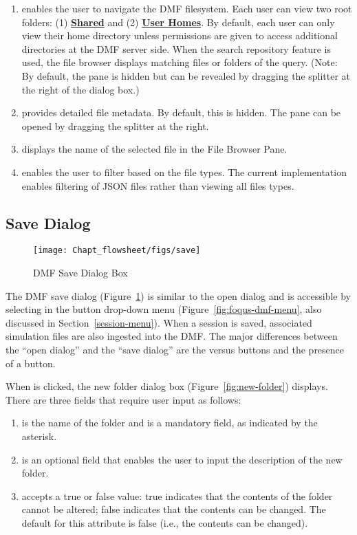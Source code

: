 {\begin{enumerate}
\item {} enables the user to navigate the DMF filesystem.
  Each user can view two root folders: (1) \textbf{\underline{Shared}} and (2) \textbf{\underline{User Homes}}. By default, each user can only view their home directory
  unless permissions are given to access additional directories at the DMF server side.
  When the search repository feature is used, the file browser displays matching files or folders of the query.
  (Note: By default, the pane is hidden but can be revealed by dragging the
  splitter at the right of the dialog box.)
\item {} provides detailed file metadata. By default, this is hidden. The pane can be opened by dragging the splitter at the right.
\item {} displays the name of the selected file in the File Browser Pane.
\item {} enables the user to filter based on the file types. The current implementation enables filtering of JSON files rather than viewing all files types.
\end{enumerate}

\subsection{Save Dialog}
\label{save-dialog}

\begin{figure}[H]
  \centering
  \texttt{[image: Chapt\_flowsheet/figs/save]}
  \caption{DMF Save Dialog Box}
  \label{fig:save-dialog}
\end{figure}

The DMF save dialog (Figure~\ref{fig:save-dialog}) is similar to the open dialog and is accessible by selecting  in the  button drop-down menu
(Figure~\ref{fig:foqus-dmf-menu}, also discussed in Section~\ref{session-menu}). When a session is saved, associated simulation files are also ingested into the DMF.
The major differences between the ``open dialog'' and the ``save dialog'' are the  versus  buttons and the presence of a  button.

When  is clicked, the new folder dialog box (Figure~\ref{fig:new-folder}) displays.
There are three fields that require user input as follows:
\begin{enumerate}
\item {} is the name of the folder and is a mandatory field, as indicated by the asterisk.
\item {} is an optional field that enables the user to input the description of the new folder.
\item {} accepts a true or false value: true indicates that the contents of the
folder cannot be altered; false indicates that the contents can be changed. The default for this
attribute is false (i.e., the contents can be changed).
\end{enumerate}

}
